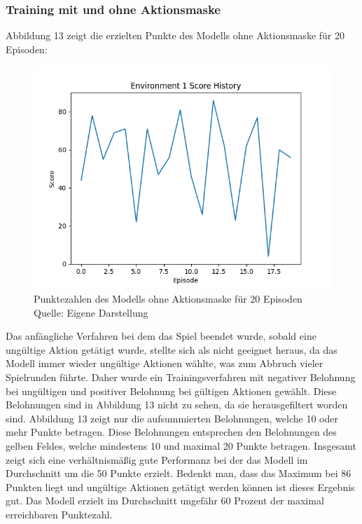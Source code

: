 \subsubsection{Training mit und ohne Aktionsmaske}
Abbildung 13 zeigt die erzielten Punkte des Modells ohne Aktionsmaske für 20 Episoden:
\nopagebreak
\begin{figure}[H]
	\includegraphics[width=1\textwidth]{Bilder/trainingwithoutcancalation} 
	\caption[Punktezahlen des Modells ohne Aktionsmaske für 20 Episoden]{Punktezahlen des Modells ohne Aktionsmaske für 20 Episoden\\ Quelle: Eigene Darstellung}
\end{figure}

Das anfängliche Verfahren bei dem das Spiel beendet wurde, sobald eine ungültige Aktion getätigt wurde, stellte sich als nicht geeignet heraus, da das Modell immer wieder ungültige Aktionen wählte, was zum Abbruch vieler Spielrunden führte. Daher wurde ein Trainingsverfahren mit negativer Belohnung bei ungültigen und positiver Belohnung bei gültigen Aktionen gewählt. Diese Belohnungen sind in Abbildung 13 nicht zu sehen, da sie herausgefiltert worden sind. Abbildung 13 zeigt nur die aufsummierten Belohnungen, welche 10 oder mehr Punkte betragen. Diese Belohnungen entsprechen den Belohnungen des gelben Feldes, welche mindestens 10 und maximal 20 Punkte betragen. Insgesamt zeigt sich eine verhältnismäßig gute Performanz bei der das Modell im Durchschnitt um die 50 Punkte erzielt. Bedenkt man, dass das Maximum bei 86 Punkten liegt und ungültige Aktionen getätigt werden können ist dieses Ergebnis gut. Das Modell erzielt im Durchschnitt ungefähr 60 Prozent der maximal erreichbaren Punktezahl.\\

